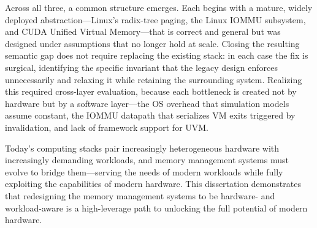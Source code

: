 Across all three, a common structure emerges.
Each begins with a mature, widely deployed abstraction---Linux's radix-tree paging, the
Linux IOMMU subsystem, and CUDA Unified Virtual Memory---that is correct and general but
was designed under assumptions that no longer hold at scale.
Closing the resulting semantic gap does not require replacing the existing stack: in each
case the fix is surgical, identifying the specific invariant that the legacy design
enforces unnecessarily and relaxing it while retaining the surrounding system.
Realizing this required cross-layer evaluation, because each bottleneck is created not by
hardware but by a software layer---the OS overhead that simulation models assume constant,
the IOMMU datapath that serializes VM exits triggered by invalidation, 
and lack of framework support for UVM.

Today's computing stacks pair increasingly heterogeneous hardware with increasingly
demanding workloads, and memory management systems must evolve to bridge them---serving
the needs of modern workloads while fully exploiting the capabilities of modern hardware.
This dissertation demonstrates that redesigning the memory management systems to be hardware- and workload-aware is a high-leverage path
to unlocking the full potential of modern hardware.